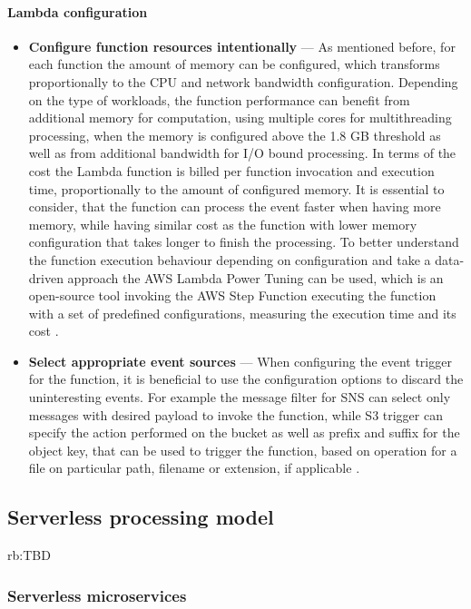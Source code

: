 \paragraph{Lambda configuration}

\begin{itemize}
   \item \textbf{Configure function resources intentionally} --- As mentioned before, for each function the amount of memory can be configured, which transforms proportionally to the CPU and network bandwidth configuration.
   Depending on the type of workloads, the function performance can benefit from additional memory for computation, using multiple cores for multithreading processing, when the memory is configured above the 1.8 GB threshold as well as from additional bandwidth for I/O bound processing.
   In terms of the cost the Lambda function is billed per function invocation and execution time, proportionally to the amount of configured memory.
   It is essential to consider, that the function can process the event faster when having more memory, while having similar cost as the function with lower memory configuration that takes longer to finish the processing.
   To better understand the function execution behaviour depending on configuration and take a data-driven approach the AWS Lambda Power Tuning can be used, which is an open-source tool invoking the AWS Step Function executing the function with a set of predefined configurations, measuring the execution time and its cost \cite{BecomeAServerlessBlackBelt}.
   \item \textbf{Select appropriate event sources} --- When configuring the event trigger for the function, it is beneficial to use the configuration options to discard the uninteresting events. For example the message filter for SNS can select only messages with desired payload to invoke the function, while S3 trigger can specify the action performed on the bucket as well as prefix and suffix for the object key, that can be used to trigger the function, based on operation for a file on particular path, filename or extension, if applicable \cite{BecomeAServerlessBlackBelt}.
\end{itemize}

\subsection{Serverless processing model}

rb:TBD

\subsubsection{Serverless microservices} 

